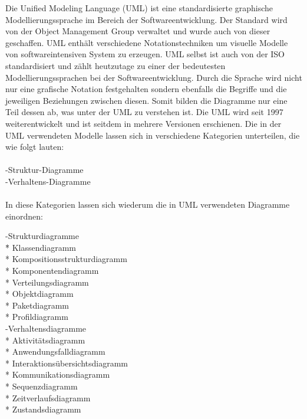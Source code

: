 Die Unified Modeling Language (UML) ist eine standardisierte graphische Modellierungssprache im Bereich der Softwareentwicklung. Der Standard wird von der Object Management Group verwaltet und wurde auch von dieser geschaffen. UML enthält verschiedene Notationstechniken um visuelle Modelle von softwareintensiven System zu erzeugen. UML selbst ist auch von der ISO standardisiert und zählt heutzutage zu einer der bedeutesten Modellierungssprachen bei der Softwareentwicklung. Durch die Sprache wird nicht nur eine grafische Notation festgehalten sondern ebenfalls die Begriffe und die jeweiligen Beziehungen zwischen diesen. Somit bilden die Diagramme nur eine Teil dessen ab, was unter der UML zu verstehen ist.
Die UML wird seit 1997 weiterentwickelt und ist seitdem in mehrere Versionen erschienen.
Die in der UML verwendeten Modelle lassen sich in verschiedene Kategorien unterteilen, die wie folgt lauten:\\
\\
-Struktur-Diagramme\\
-Verhaltens-Diagramme\\
\\
In diese Kategorien lassen sich wiederum die in UML verwendeten Diagramme einordnen:\\
\begin{tabbing}
-Strukturdiagramme\\
\hspace{20mm} \=* Klassendiagramm\\
		   \> 	* Kompositionsstrukturdiagramm\\
		   \> 	* Komponentendiagramm\\
		   \> 	* Verteilungsdiagramm\\
		   \> 	* Objektdiagramm\\
		   \> 	* Paketdiagramm\\
		   \> 	* Profildiagramm\\
-Verhaltensdiagramme\\
		   \> 	* Aktivitätsdiagramm\\
		   \> 	* Anwendungsfalldiagramm\\
		   \> 	* Interaktionsübersichtsdiagramm\\
		   \> 	* Kommunikationsdiagramm\\
		   \> 	* Sequenzdiagramm\\
		   \> 	* Zeitverlaufsdiagramm\\
		   \> 	* Zustandsdiagramm\\
\end{tabbing}    
